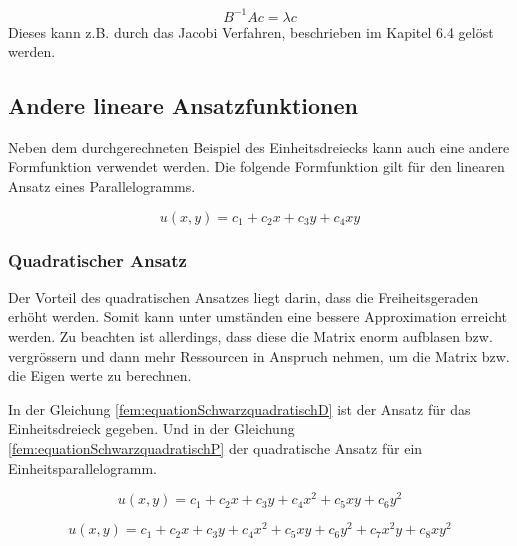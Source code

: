 \begin{equation}
		B^{-1}Ac = \lambda c
 \end{equation}
 Dieses kann z.B. durch das Jacobi Verfahren, beschrieben im Kapitel 6.4 gelöst werden.
 
\subsection{Andere lineare Ansatzfunktionen
\label{fem:subsection:Ansatzfunktionen}}

Neben dem durchgerechneten Beispiel des Einheitsdreiecks kann auch eine andere Formfunktion verwendet werden. Die folgende Formfunktion gilt für den linearen Ansatz eines Parallelogramms.

\begin{equation}
	u(x,y) = c_1 + c_2 x + c_3 y + c_4 xy
\end{equation} 


\subsubsection{Quadratischer Ansatz
\label{fem:subsection:bonorum}}

Der Vorteil des quadratischen Ansatzes liegt darin, dass die Freiheitsgeraden erhöht werden. Somit kann unter umständen eine bessere Approximation erreicht werden.
Zu beachten ist allerdings, dass diese die Matrix enorm aufblasen bzw. vergrössern und dann mehr Ressourcen in Anspruch nehmen, um die Matrix bzw. die Eigen werte zu berechnen.

In der Gleichung \ref{fem:equationSchwarzquadratischD}  ist der Ansatz für das Einheitsdreieck gegeben. Und in der Gleichung \ref{fem:equationSchwarzquadratischP} der quadratische Ansatz für ein Einheitsparallelogramm.

\begin{equation}
	u(x,y) = c_1 + c_2 x + c_3 y + c_4 x^2 + c_5 xy + c_6 y^2
	\label{fem:equationSchwarzquadratischD}
\end{equation}

\begin{equation}
	u(x,y) = c_1 + c_2 x + c_3 y + c_4 x^2 + c_5 xy + c_6 y^2 + c_7 x^2y + c_8 xy^2
	\label{fem:equationSchwarzquadratischP}
\end{equation} 



